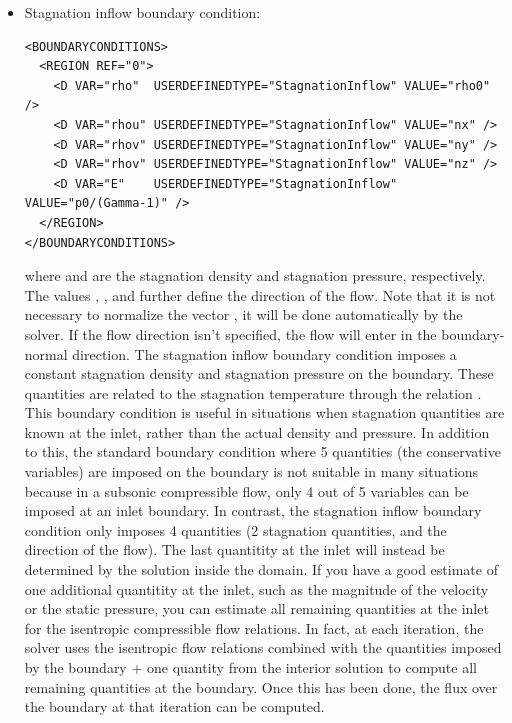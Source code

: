 \begin{itemize}
\item Stagnation inflow boundary condition:
\begin{lstlisting}[style=XmlStyle]
<BOUNDARYCONDITIONS>
  <REGION REF="0">
    <D VAR="rho"  USERDEFINEDTYPE="StagnationInflow" VALUE="rho0" />
    <D VAR="rhou" USERDEFINEDTYPE="StagnationInflow" VALUE="nx" />
    <D VAR="rhov" USERDEFINEDTYPE="StagnationInflow" VALUE="ny" />
    <D VAR="rhov" USERDEFINEDTYPE="StagnationInflow" VALUE="nz" />
    <D VAR="E"    USERDEFINEDTYPE="StagnationInflow" VALUE="p0/(Gamma-1)" />
  </REGION>
</BOUNDARYCONDITIONS>
\end{lstlisting}
where  and  are the stagnation density and stagnation pressure, respectively.
The values , , and  further define the direction of the flow. Note that 
it is not necessary to normalize the vector , it will be done automatically by the 
solver. If the flow direction isn't specified, the flow will enter in the boundary-normal direction.
The stagnation inflow boundary condition imposes a constant stagnation density and stagnation pressure 
on the boundary. These quantities are related to the stagnation temperature through the relation
. This boundary condition is useful in situations when stagnation
quantities are known at the inlet, rather than the actual density and pressure. In addition to this, the
standard boundary condition where 5 quantities (the conservative variables) are imposed on the boundary
is not suitable in many situations because in a subsonic compressible flow, only 4 out of 5 variables
can be imposed at an inlet boundary. In contrast, the stagnation inflow boundary condition only imposes
4 quantities (2 stagnation quantities, and the direction of the flow). The last quantitity at the inlet
will instead be determined by the solution inside the domain. If you have a good estimate of one additional 
quantitity at the inlet, such as the magnitude of the velocity or the static pressure, you can estimate 
all remaining quantities at the inlet for the isentropic compressible flow relations. In fact, at each 
iteration, the solver uses the isentropic flow relations combined with the quantities imposed by the
boundary + one quantity from the interior solution to compute all remaining quantities at the boundary.
Once this has been done, the flux over the boundary at that iteration can be computed.

\end{itemize}

